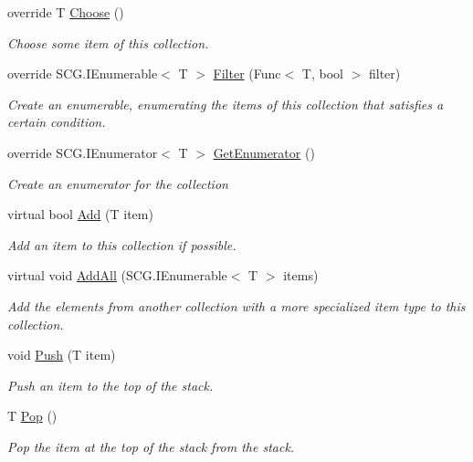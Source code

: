 \begin{DoxyCompactItemize}
override T \hyperlink{class_c5_1_1_linked_list_a50a8bc512629f661b2e98a1dc860cc9f}{Choose} ()
\begin{DoxyCompactList}\small\item\em Choose some item of this collection. \end{DoxyCompactList}\item 
override S\+C\+G.\+I\+Enumerable$<$ T $>$ \hyperlink{class_c5_1_1_linked_list_a5027335e5234dc6a6e3a164d79ccae62}{Filter} (Func$<$ T, bool $>$ filter)
\begin{DoxyCompactList}\small\item\em Create an enumerable, enumerating the items of this collection that satisfies a certain condition. \end{DoxyCompactList}\item 
override S\+C\+G.\+I\+Enumerator$<$ T $>$ \hyperlink{class_c5_1_1_linked_list_ab23965434fba5e39a15eb4c0eb3c4901}{Get\+Enumerator} ()
\begin{DoxyCompactList}\small\item\em Create an enumerator for the collection \end{DoxyCompactList}\item 
virtual bool \hyperlink{class_c5_1_1_linked_list_ac205fdb2cfc336ee2c2843c04fcbad41}{Add} (T item)
\begin{DoxyCompactList}\small\item\em Add an item to this collection if possible. \end{DoxyCompactList}\item 
virtual void \hyperlink{class_c5_1_1_linked_list_a73d13a68c32ac82f82bed4d8934cc888}{Add\+All} (S\+C\+G.\+I\+Enumerable$<$ T $>$ items)
\begin{DoxyCompactList}\small\item\em Add the elements from another collection with a more specialized item type to this collection. \end{DoxyCompactList}\item 
void \hyperlink{class_c5_1_1_linked_list_a68cbe5dea51155f445ed4122d6179e7a}{Push} (T item)
\begin{DoxyCompactList}\small\item\em Push an item to the top of the stack. \end{DoxyCompactList}\item 
T \hyperlink{class_c5_1_1_linked_list_a3eb4c23e2958308e73008fae1b1cf946}{Pop} ()
\begin{DoxyCompactList}\small\item\em Pop the item at the top of the stack from the stack. \end{DoxyCompactList}\item 

\end{DoxyCompactItemize}
